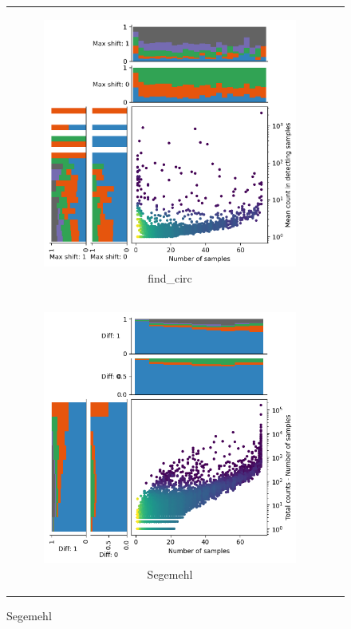 \begin{figure}[ht]
\begin{tabular}{cc}
\begin{subfigure}{.4\textwidth}
                       \includegraphics[width=\linewidth]{chapters/4_results_and_discussion/figures/detection/density/find_circ.png}
                       \caption{find\_circ}
                       \label{fig:detection_density_find-circ} \end{subfigure}
               \\ \begin{subfigure}{.4\textwidth} \centering

            \includegraphics[width=\linewidth]{chapters/4_results_and_discussion/figures/detection/density/segemehl.png}
            \caption{Segemehl} \label{fig:detection_density_segemehl}
        \end{subfigure}


\end{tabular}
\end{figure}
